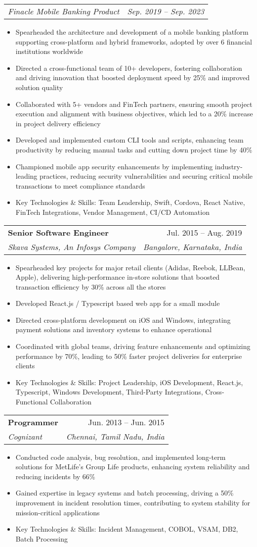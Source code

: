 \documentclass[letterpaper,11pt]{article}
\makeatletter
\newcommand{\resumeItem}[1]{
  \item\small{
    {#1 \vspace{-2pt}}
  }
}
\newcommand{\resumeSubheading}[4]{
  \vspace{-2pt}\item
    \begin{tabular*}{0.97\textwidth}[t]{l@{\extracolsep{\fill}}r}
      \textbf{#1} & #2 \\
      \textit{\small#3} & \textit{\small #4} \\
    \end{tabular*}\vspace{-7pt}
}
\newcommand{\resumeSubSubheading}[2]{
    \item
    \begin{tabular*}{0.97\textwidth}{l@{\extracolsep{\fill}}r}
      \textit{\small#1} & \textit{\small #2} \\
    \end{tabular*}\vspace{-7pt}
}
\newcommand{\resumeItemListStart}{\begin{itemize}}
\newcommand{\resumeItemListEnd}{\end{itemize}\vspace{-5pt}}
\makeatother
\begin{document}
      \resumeSubSubheading
        {Finacle Mobile Banking Product}{Sep. 2019 -- Sep. 2023}
        \resumeItemListStart
          \resumeItem{Spearheaded the architecture and development of a mobile banking platform supporting cross-platform and hybrid frameworks, adopted by over 6 financial institutions worldwide}
          \resumeItem{Directed a cross-functional team of 10+ developers, fostering collaboration and driving innovation that boosted deployment speed by 25\% and improved solution quality}
          \resumeItem{Collaborated with 5+ vendors and FinTech partners, ensuring smooth project execution and alignment with business objectives, which led to a 20\% increase in project delivery efficiency}
          \resumeItem{Developed and implemented custom CLI tools and scripts, enhancing team productivity by reducing manual tasks and cutting down project time by 40\%}
          \resumeItem{Championed mobile app security enhancements by implementing industry-leading practices, reducing security vulnerabilities and securing critical mobile transactions to meet compliance standards}
          \resumeItem{Key Technologies \& Skills: Team Leadership, Swift, Cordova, React Native, FinTech Integrations, Vendor Management, CI/CD Automation}
        \resumeItemListEnd

    \resumeSubheading
      {Senior Software Engineer}{Jul. 2015 -- Aug. 2019}
      {Skava Systems, An Infosys Company}{Bangalore, Karnataka, India}
      \resumeItemListStart
        \resumeItem{Spearheaded key projects for major retail clients (Adidas, Reebok, LLBean, Apple), delivering high-performance in-store solutions that boosted transaction efficiency by 30\% across all the stores}
        \resumeItem{Developed React.js / Typescript based web app for a small module}
        \resumeItem{Directed cross-platform development on iOS and Windows, integrating payment solutions and inventory systems to enhance operational}
        \resumeItem{Coordinated with global teams, driving feature enhancements and optimizing performance by 70\%, leading to 50\% faster project deliveries for enterprise clients}
        \resumeItem{Key Technologies \& Skills: Project Leadership, iOS Development, React.js, Typescript, Windows Development, Third-Party Integrations, Cross-Functional Collaboration}
      \resumeItemListEnd

    \resumeSubheading
      {Programmer}{Jun. 2013 -- Jun. 2015}
      {Cognizant}{Chennai, Tamil Nadu, India}
      \resumeItemListStart
        \resumeItem{Conducted code analysis, bug resolution, and implemented long-term solutions for MetLife's Group Life products, enhancing system reliability and reducing incidents by 66\%}
        \resumeItem{Gained expertise in legacy systems and batch processing, driving a 50\% improvement in incident resolution times, contributing to system stability for mission-critical applications}
        \resumeItem{Key Technologies \& Skills: Incident Management, COBOL, VSAM, DB2, Batch Processing}
      \resumeItemListEnd
\end{document}
